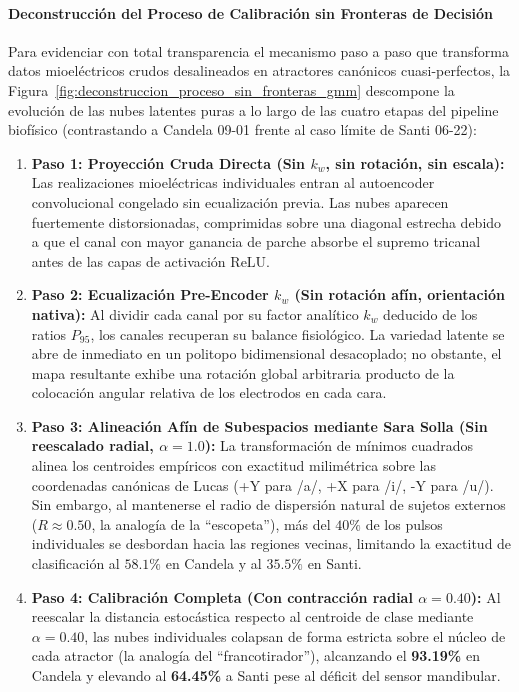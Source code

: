 \documentclass[11pt,a4paper]{article}
\begin{document}
\paragraph{Deconstrucción del Proceso de Calibración sin Fronteras de Decisión}
Para evidenciar con total transparencia el mecanismo paso a paso que transforma datos mioeléctricos crudos desalineados en atractores canónicos cuasi-perfectos, la Figura~\ref{fig:deconstruccion_proceso_sin_fronteras_gmm} descompone la evolución de las nubes latentes puras a lo largo de las cuatro etapas del pipeline biofísico (contrastando a Candela 09-01 frente al caso límite de Santi 06-22):

\begin{enumerate}
    \item \textbf{Paso 1: Proyección Cruda Directa (Sin $k_w$, sin rotación, sin escala):} Las realizaciones mioeléctricas individuales entran al autoencoder convolucional congelado sin ecualización previa. Las nubes aparecen fuertemente distorsionadas, comprimidas sobre una diagonal estrecha debido a que el canal con mayor ganancia de parche absorbe el supremo tricanal antes de las capas de activación $\text{ReLU}$.
    \item \textbf{Paso 2: Ecualización Pre-Encoder $k_w$ (Sin rotación afín, orientación nativa):} Al dividir cada canal por su factor analítico $k_w$ deducido de los ratios $P_{95}$, los canales recuperan su balance fisiológico. La variedad latente se abre de inmediato en un politopo bidimensional desacoplado; no obstante, el mapa resultante exhibe una rotación global arbitraria producto de la colocación angular relativa de los electrodos en cada cara.
    \item \textbf{Paso 3: Alineación Afín de Subespacios mediante Sara Solla (Sin reescalado radial, $\alpha = 1.0$):} La transformación de mínimos cuadrados alinea los centroides empíricos con exactitud milimétrica sobre las coordenadas canónicas de Lucas (+Y para /a/, +X para /i/, -Y para /u/). Sin embargo, al mantenerse el radio de dispersión natural de sujetos externos ($R \approx 0.50$, la analogía de la ``escopeta''), más del $40\%$ de los pulsos individuales se desbordan hacia las regiones vecinas, limitando la exactitud de clasificación al $58.1\%$ en Candela y al $35.5\%$ en Santi.
    \item \textbf{Paso 4: Calibración Completa (Con contracción radial $\alpha = 0.40$):} Al reescalar la distancia estocástica respecto al centroide de clase mediante $\alpha = 0.40$, las nubes individuales colapsan de forma estricta sobre el núcleo de cada atractor (la analogía del ``francotirador''), alcanzando el \textbf{93.19\%} en Candela y elevando al \textbf{64.45\%} a Santi pese al déficit del sensor mandibular.
\end{enumerate}
\end{document}
